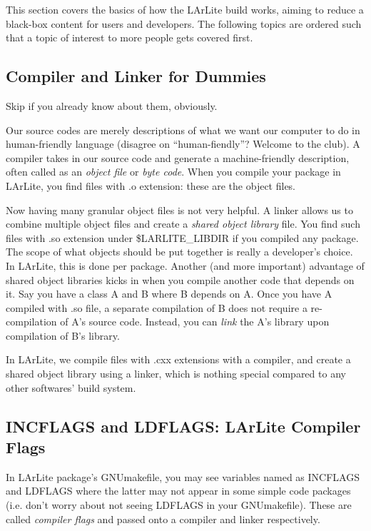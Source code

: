 This section covers the basics of how the LArLite build works, aiming to reduce a black-box content for users and developers.
The following topics are ordered such that a topic of interest to more people gets covered first.

\subsection{{\ttfamily Compiler} and {\ttfamily Linker} for Dummies}
Skip if you already know about them, obviously.

Our \CPP source codes are merely descriptions of what we want our computer to do in human-friendly language 
(disagree on ``human-fiendly''? Welcome to the club).
A {\ttfamily compiler} takes in our source code and generate a machine-friendly description, often called as an {\it object file} or {\it byte code}.
When you compile your package in LArLite, you find files with {\ttfamily .o} extension: these are the object files.

Now having many granular object files is not very helpful.
A {\ttfamily linker} allows us to combine multiple object files and create a {\it shared object library} file.
You find such files with {\ttfamily .so} extension under {\ttfamily \$LARLITE\_LIBDIR} if you compiled any package.
The scope of what objects should be put together is really a developer's choice.
In LArLite, this is done per package.
Another (and more important) advantage of shared object libraries kicks in when you compile another code that depends on it.
Say you have a \CPP class {\ttfamily A} and {\ttfamily B} where {\ttfamily B} depends on {\ttfamily A}. 
Once you have {\ttfamily A} compiled with {\ttfamily .so} file, a separate compilation of {\ttfamily B} does not require
a re-compilation of {\ttfamily A}'s source code. Instead, you can {\it link} the {\ttfamily A}'s library upon compilation
of {\ttfamily B}'s library.

In LArLite, we compile files with {\ttfamily .cxx} extensions with a compiler, and create a shared object library using a linker, which
is nothing special compared to any other softwares' build system.

\subsection{{\ttfamily INCFLAGS} and {\ttfamily LDFLAGS}: LArLite Compiler Flags}
In LArLite package's {\ttfamily GNUmakefile}, you may see variables named as {\ttfamily INCFLAGS} and {\ttfamily LDFLAGS} where
the latter may not appear in some simple code packages (i.e. don't worry about not seeing {\ttfamily LDFLAGS} in your {\ttfamily GNUmakefile}).
These are called {\it compiler flags} and passed onto a compiler and linker respectively.

